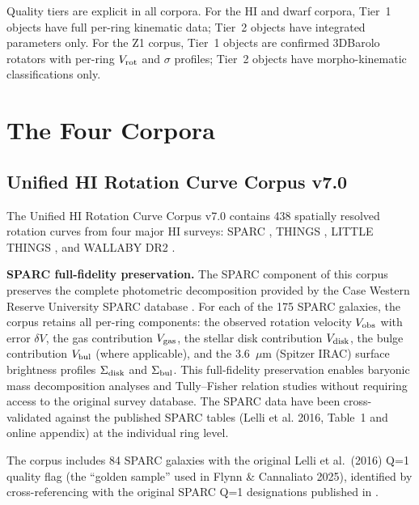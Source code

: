\documentclass[twocolumn]{aastex631}
\begin{document}
Quality tiers are explicit in all corpora. For the HI and dwarf corpora,
Tier~1 objects have full per-ring kinematic data; Tier~2 objects have
integrated parameters only. For the Z1 corpus, Tier~1 objects are confirmed
3DBarolo rotators with per-ring $V_{\rm rot}$ and $\sigma$ profiles;
Tier~2 objects have morpho-kinematic classifications only.

\section{The Four Corpora}
\label{sec:corpora}

\subsection{Unified HI Rotation Curve Corpus v7.0}
\label{sec:hi}

The Unified HI Rotation Curve Corpus v7.0 \citep{flynn2026_hi} contains 438
spatially resolved rotation curves from four major HI surveys: SPARC
\citep[175 galaxies;][]{lelli2016}, THINGS \citep[34 galaxies;][]{walter2008},
LITTLE THINGS \citep[26 galaxies;][]{oh2015}, and WALLABY DR2
\citep[203 galaxies;][]{koribalski2020}.

\textbf{SPARC full-fidelity preservation.} The SPARC component of this corpus
preserves the complete photometric decomposition provided by the Case Western
Reserve University SPARC database \citep{lelli2016}. For each of the 175 SPARC
galaxies, the corpus retains all per-ring components: the observed rotation
velocity $V_{\rm obs}$ with error $\delta V$, the gas contribution $V_{\rm gas}$,
the stellar disk contribution $V_{\rm disk}$, the bulge contribution $V_{\rm bul}$
(where applicable), and the 3.6~$\mu$m (Spitzer IRAC) surface brightness profiles $\Sigma_{\rm disk}$
and $\Sigma_{\rm bul}$. This full-fidelity preservation enables baryonic mass
decomposition analyses and Tully--Fisher relation studies without requiring
access to the original survey database. The SPARC data have been cross-validated
against the published SPARC tables (Lelli et al. 2016, Table~1 and online
appendix) at the individual ring level.

The corpus includes 84 SPARC galaxies with the original Lelli et al.\ (2016) Q=1 quality flag (the ``golden sample'' used in Flynn \& Cannaliato 2025), identified by cross-referencing with the original SPARC Q=1 designations published in \citet{lelli2016}.
\end{document}
